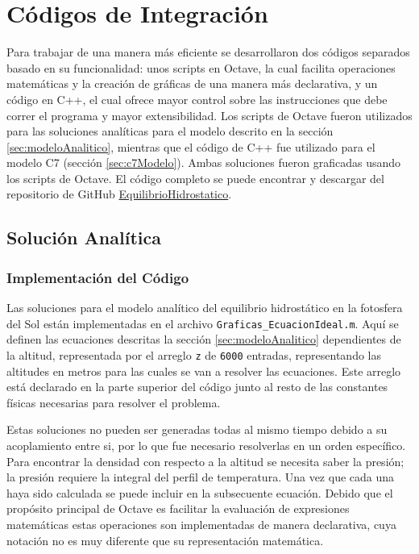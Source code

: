 \section{Códigos de Integración}

Para trabajar de una manera más eficiente se desarrollaron dos códigos separados
basado en su funcionalidad: unos scripts en Octave, la cual facilita operaciones
matemáticas y la creación de gráficas de una manera más declarativa, y un código
en C++, el cual ofrece mayor control sobre las instrucciones que debe correr el
programa y mayor extensibilidad. Los scripts de Octave fueron utilizados para
las soluciones analíticas para el modelo descrito en la sección
\ref{sec:modeloAnalitico}, mientras que el código de C++ fue utilizado para el
modelo C7 (sección \ref{sec:c7Modelo}). Ambas soluciones fueron graficadas
usando los scripts de Octave. El código completo se puede encontrar y descargar
del repositorio de GitHub
\href{https://github.com/KnightIV/EquilibrioHidrostatico}{EquilibrioHidrostatico}.

\subsection{Solución Analítica}

\subsubsection{Implementación del Código}
Las soluciones para el modelo analítico del equilibrio hidrostático en la
fotosfera del Sol están implementadas en el archivo
\verb|Graficas_EcuacionIdeal.m|. Aquí se definen las ecuaciones descritas la
sección \ref{sec:modeloAnalitico} dependientes de la altitud, representada por
el arreglo \verb|z| de \verb|6000| entradas, representando las altitudes en
metros para las cuales se van a resolver las ecuaciones. Este arreglo está
declarado en la parte superior del código junto al resto de las constantes
físicas necesarias para resolver el problema. 

Estas soluciones no pueden ser generadas todas al mismo tiempo debido a su
acoplamiento entre si, por lo que fue necesario resolverlas en un orden
específico. Para encontrar la densidad con respecto a la altitud se necesita
saber la presión; la presión requiere la integral del perfil de temperatura. Una
vez que cada una haya sido calculada se puede incluir en la subsecuente
ecuación. Debido que el propósito principal de Octave es facilitar la evaluación
de expresiones matemáticas estas operaciones son implementadas de manera
declarativa, cuya notación no es muy diferente que su representación matemática. 

